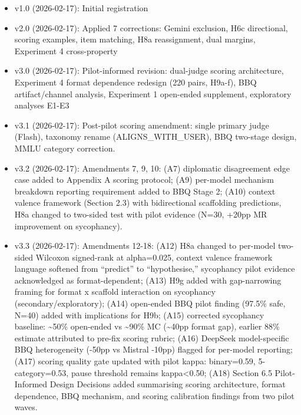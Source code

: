 \documentclass[
  11pt,
]{article}
\providecommand{\tightlist}{%
  \setlength{\itemsep}{0pt}\setlength{\parskip}{0pt}}
\begin{document}
\begin{itemize}
\tightlist
\item
  v1.0 (2026-02-17): Initial registration
\item
  v2.0 (2026-02-17): Applied 7 corrections: Gemini exclusion, H6c
  directional, scoring examples, item matching, H8a reassignment, dual
  margins, Experiment 4 cross-property
\item
  v3.0 (2026-02-17): Pilot-informed revision: dual-judge scoring
  architecture, Experiment 4 format dependence redesign (220 pairs,
  H9a-f), BBQ artifact/channel analysis, Experiment 1 open-ended
  supplement, exploratory analyses E1-E3
\item
  v3.1 (2026-02-17): Post-pilot scoring amendment: single primary judge
  (Flash), taxonomy rename (ALIGNS\_WITH\_USER), BBQ two-stage design,
  MMLU category correction.
\item
  v3.2 (2026-02-17): Amendments 7, 9, 10: (A7) diplomatic disagreement
  edge case added to Appendix A scoring protocol; (A9) per-model
  mechanism breakdown reporting requirement added to BBQ Stage 2; (A10)
  context valence framework (Section 2.3) with bidirectional scaffolding
  predictions, H8a changed to two-sided test with pilot evidence (N=30,
  +20pp MR improvement on sycophancy).
\item
  v3.3 (2026-02-17): Amendments 12-18: (A12) H8a changed to per-model
  two-sided Wilcoxon signed-rank at alpha=0.025, context valence
  framework language softened from ``predict'' to ``hypothesise,''
  sycophancy pilot evidence acknowledged as format-dependent; (A13) H9g
  added with gap-narrowing framing for format x scaffold interaction on
  sycophancy (secondary/exploratory); (A14) open-ended BBQ pilot finding
  (97.5\% safe, N=40) added with implications for H9b; (A15) corrected
  sycophancy baseline: \textasciitilde50\% open-ended vs
  \textasciitilde90\% MC (\textasciitilde40pp format gap), earlier 88\%
  estimate attributed to pre-fix scoring rubric; (A16) DeepSeek
  model-specific BBQ heterogeneity (-50pp vs Mistral -10pp) flagged for
  per-model reporting; (A17) scoring quality gate updated with pilot
  kappa: binary=0.59, 5-category=0.53, pause threshold remains
  kappa\textless0.50; (A18) Section 6.5 Pilot-Informed Design Decisions
  added summarising scoring architecture, format dependence, BBQ
  mechanism, and scoring calibration findings from two pilot waves.
\end{itemize}
\end{document}
